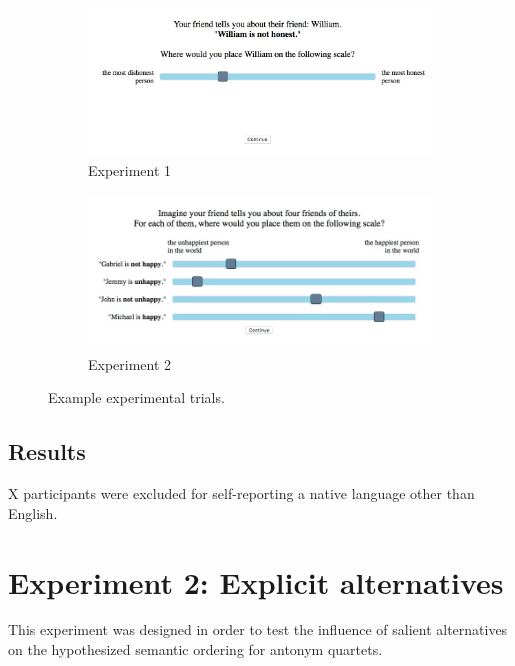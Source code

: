 \documentclass[10pt,letterpaper]{article}
\begin{document}
\begin{figure}[t]
	\centering
	\begin{subfigure}[t]{0.5\textwidth}
		\centering
		\includegraphics[width=\textwidth]{expt1.jpeg}
		\caption{Experiment 1}\label{fig:expt1}		
	\end{subfigure}%
	\begin{subfigure}[t]{0.5\textwidth}
		\centering
		\includegraphics[width=\textwidth]{expt2.jpeg}
		\caption{Experiment 2}\label{fig:expt2}
	\end{subfigure}
	\caption{Example experimental trials.}\label{fig:expt-procedure}
\end{figure}



\subsection{Results}

X participants were excluded for self-reporting a native language other than English. 


\section{Experiment 2: Explicit alternatives}
This experiment was designed in order to test the influence of salient alternatives on the hypothesized semantic ordering for antonym quartets.
\end{document}
